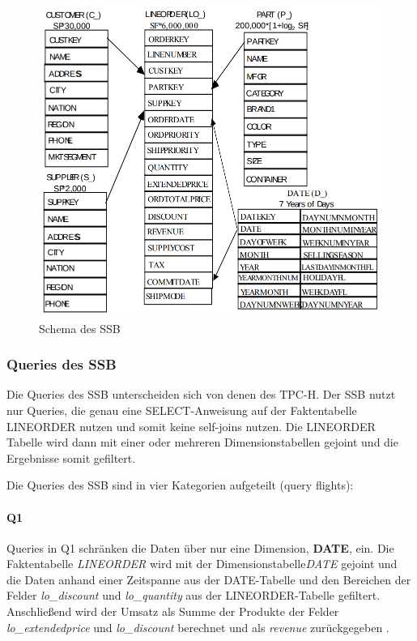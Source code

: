 \begin{figure}[ht]  %
    \centering      %
    \includegraphics[width=1\textwidth]{pictures/ssb/ssb-schema.png}
    \caption{Schema des \ac{SSB}~\cite{oneil_star_2009}}      %
    \label{pic:ssb-schema}    %
\end{figure}


\subsubsection{Queries des \ac{SSB}}
Die Queries des \ac{SSB} unterscheiden sich von denen des \ac{TPC-H}.
Der \ac{SSB} nutzt nur Queries, die genau eine SELECT-Anweisung auf der Faktentabelle LINEORDER nutzen und somit keine self-joins nutzen. %
Die LINEORDER Tabelle wird dann mit einer oder mehreren Dimensionstabellen gejoint und die Ergebnisse somit gefiltert. 

Die Queries des \ac{SSB} sind in vier Kategorien aufgeteilt (query flights): %


\paragraph{Q1}
Queries in Q1 schränken die Daten über nur eine Dimension, \textbf{DATE}, ein.
Die Faktentabelle \emph{LINEORDER} wird mit der Dimensionstabelle\emph{DATE} gejoint und die Daten anhand einer Zeitspanne aus der DATE-Tabelle und den Bereichen der Felder \emph{lo\_discount} und \emph{lo\_quantity} aus der LINEORDER-Tabelle gefiltert.
Anschließend wird der Umsatz als Summe der Produkte der Felder \emph{lo\_extendedprice} und \emph{lo\_discount} berechnet und als \emph{revenue} zurückgegeben \cite{oneil_star_2009}.


